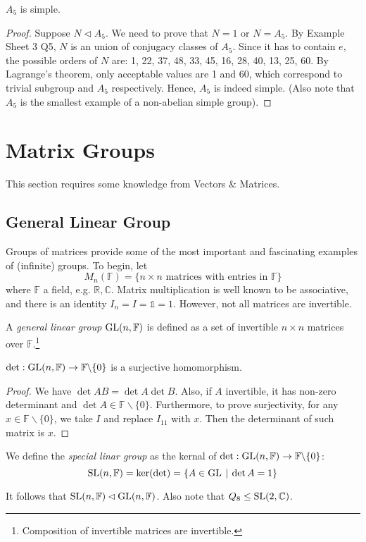 \documentclass[10pt, a4paper, twoside]{report}
\begin{document}
\begin{theorem}
    \(A_5\) is simple.
\end{theorem}
\begin{proof}
    Suppose \(N\lhd A_5\). We need to prove that \(N=1\) or \(N=A_5\). By Example Sheet 3 Q5, \(N\) is an union of conjugacy classes of \(A_5\). Since it has to contain \(e\), the possible orders of \(N\) are: 1, 22, 37, 48, 33, 45, 16, 28, 40, 13, 25, 60. By Lagrange's theorem, only acceptable values are 1 and 60, which correspond to trivial subgroup and \(A_5\) respectively. Hence, \(A_5\) is indeed simple. (Also note that \(A_5\) is the smallest example of a non-abelian simple group).
\end{proof}
\section{Matrix Groups}
This section requires some knowledge from Vectors \& Matrices.
\subsection{General Linear Group}
Groups of matrices provide some of the most important and fascinating examples of (infinite) groups. To begin, let 
\[M_n(\mathbb{F})=\{n\times n\text{  matrices with entries in  }\mathbb{F}\}\]
where \(\mathbb{F}\) a field, e.g. \(\mathbb{R},\mathbb{C}\). Matrix multiplication is well known to be associative, and there is an identity \(I_n=I=\mathbb{1}=1\). However, not all matrices are invertible.
\begin{definition}
    A \emph{general linear group} \(\operatorname{GL}(n,\mathbb{F})\) is defined as a set of invertible \(n\times n\) matrices over \(\mathbb{F}\).\footnote{Composition of invertible matrices are invertible.}
\end{definition}
\begin{proposition}
    \(\det:\operatorname{GL}(n,\mathbb{F})\to\mathbb{F}\backslash\{0\}\) is a surjective homomorphism.
\end{proposition}
\begin{proof}
    We have \(\det AB=\det A\det B\). Also, if \(A\) invertible, it has non-zero determinant and \(\det A\in\mathbb{F}\backslash\{0\}\). Furthermore, to prove surjectivity, for any \(x\in\mathbb{F}\backslash\{0\}\), we take \(I\) and replace \(I_{11}\) with \(x\). Then the determinant of such matrix is \(x\).
\end{proof}
\begin{definition}
    We define the \emph{special linar group} as the kernal of \(\det:\operatorname{GL}(n,\mathbb{F})\to\mathbb{F}\backslash\{0\}\):
    \[\operatorname{SL}(n,\mathbb{F})=\ker(\det)=\{A\in\operatorname{GL}\:|\:\det A=1\}\]
\end{definition}
It follows that \(\operatorname{SL}(n,\mathbb{F})\lhd\operatorname{GL}(n,\mathbb{F})\). Also note that \(Q_8\leq\operatorname{SL}(2,\mathbb{C})\).
\end{document}
